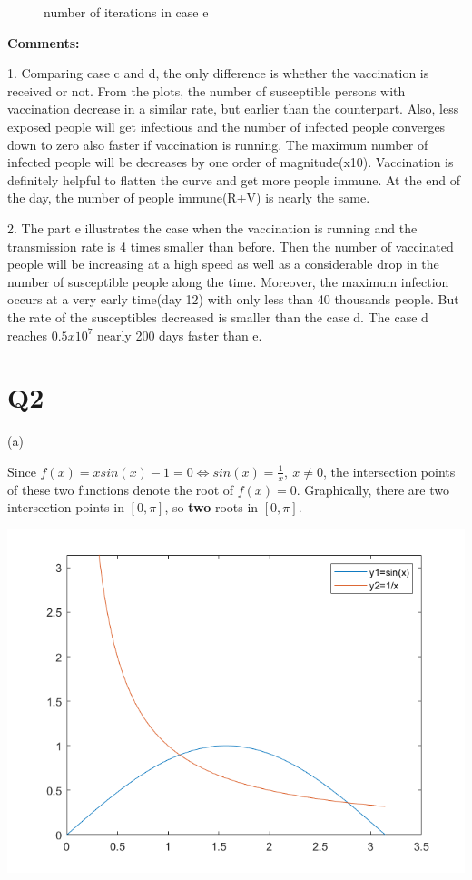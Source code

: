 \documentclass[12pt]{article}
\begin{document}
\begin{figure}[H]
  \caption{number of iterations in case e}\label{fig:awesome_image3}
\endminipage
\end{figure}

\textbf{Comments:}

1. Comparing case c and d, the only difference is whether the vaccination is received or not. From the plots, the number of susceptible persons with vaccination decrease in a similar rate, but earlier than the counterpart. Also, less exposed people will get infectious and the number of infected people converges down to zero also faster if vaccination is running. The maximum number of infected people will be decreases by one order of magnitude(x10). Vaccination is definitely helpful to flatten the curve and get more people immune. At the end of the day, the number of people immune(R+V) is nearly the same.

2. The part e illustrates the case when the vaccination is running and the transmission rate is 4 times smaller than before. Then the number of vaccinated people will be increasing at a high speed as well as a considerable drop in the number of susceptible people along the time. Moreover, the maximum infection occurs at a very early time(day 12) with only less than 40 thousands people. But the rate of the susceptibles decreased is smaller than the case d. The case d reaches $0.5x10^7$ nearly 200 days faster than e.

\section{Q2}

(a)

Since $f(x)=xsin(x)-1=0 \iff sin(x)=\frac{1}{x}, \ x\neq0$, the intersection points of these two functions denote the root of $f(x)=0$. Graphically, there are two intersection points in $[0,\pi]$, so \textbf{two} roots in $[0,\pi]$.

\includegraphics[width=150mm,scale=0.5]{2a.png}
\end{document}
